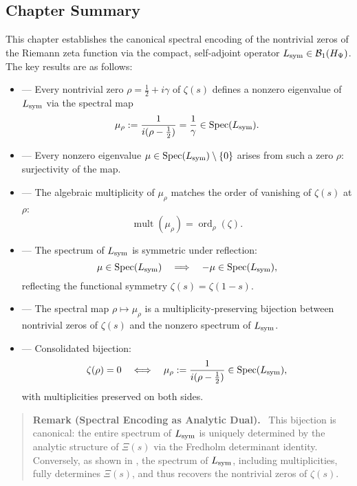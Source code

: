 \subsection*{Chapter Summary}

This chapter establishes the canonical spectral encoding of the nontrivial zeros of the Riemann zeta function via the compact, self-adjoint operator \( L_{\mathrm{sym}} \in \mathcal{B}_1(H_{\Psi}) \). The key results are as follows:

\begin{itemize}
  \item {} — Every nontrivial zero \( \rho = \tfrac{1}{2} + i\gamma \) of \( \zeta(s) \) defines a nonzero eigenvalue of \( L_{\mathrm{sym}} \) via the spectral map
  \[
  \mu_\rho := \frac{1}{i(\rho - \tfrac{1}{2})} = \frac{1}{\gamma} \in \operatorname{Spec}(L_{\mathrm{sym}}).
  \]

  \item {} — Every nonzero eigenvalue \( \mu \in \operatorname{Spec}(L_{\mathrm{sym}}) \setminus \{0\} \) arises from such a zero \( \rho \): surjectivity of the map.

  \item {} — The algebraic multiplicity of \( \mu_\rho \) matches the order of vanishing of \( \zeta(s) \) at \( \rho \):
  \[
  \operatorname{mult}(\mu_\rho) = \operatorname{ord}_\rho(\zeta).
  \]

  \item {} — The spectrum of \( L_{\mathrm{sym}} \) is symmetric under reflection:
  \[
  \mu \in \operatorname{Spec}(L_{\mathrm{sym}}) \quad \Longrightarrow \quad -\mu \in \operatorname{Spec}(L_{\mathrm{sym}}),
  \]
  reflecting the functional symmetry \( \zeta(s) = \zeta(1 - s) \).

  \item {} — The spectral map \( \rho \mapsto \mu_\rho \) is a multiplicity-preserving bijection between nontrivial zeros of \( \zeta(s) \) and the nonzero spectrum of \( L_{\mathrm{sym}} \).

  \item {} — Consolidated bijection:
  \[
  \zeta(\rho) = 0 \quad \Longleftrightarrow \quad \mu_\rho := \frac{1}{i(\rho - \tfrac{1}{2})} \in \operatorname{Spec}(L_{\mathrm{sym}}),
  \]
  with multiplicities preserved on both sides.
\end{itemize}

\begin{quote}
  \textbf{Remark (Spectral Encoding as Analytic Dual).}~
  This bijection is canonical: the entire spectrum of \( L_{\mathrm{sym}} \) is uniquely determined by the analytic structure of \( \Xi(s) \) via the Fredholm determinant identity. Conversely, as shown in , the spectrum of \( L_{\mathrm{sym}} \), including multiplicities, fully determines \( \Xi(s) \), and thus recovers the nontrivial zeros of \( \zeta(s) \).
\end{quote}

